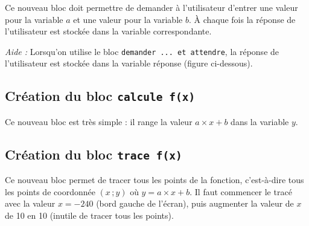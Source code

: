 
Ce nouveau bloc doit permettre de demander à l'utilisateur d'entrer une valeur pour la variable $a$ et une valeur pour la variable $b$. À chaque fois la réponse de l'utilisateur est stockée dans la variable correspondante.

\vspace{6pt}

\emph{Aide :} Lorsqu'on utilise le bloc \texttt{demander ... et attendre}, la réponse de l'utilisateur est stockée dans la variable réponse (figure ci-dessous).





\subsection{Création du bloc \texttt{calcule f(x)}}


Ce nouveau bloc est très simple : il range la valeur $a \times x + b$ dans la variable $y$.




\subsection{Création du bloc \texttt{trace f(x)}}


Ce nouveau bloc permet de tracer tous les points de la fonction, c'est-à-dire tous les points de coordonnée $(x\,;y)$ où $y=a\times x + b$. Il faut commencer le tracé avec la valeur $x=-240$ (bord gauche de l'écran), puis augmenter la valeur de $x$ de 10 en 10 (inutile de tracer tous les points).







